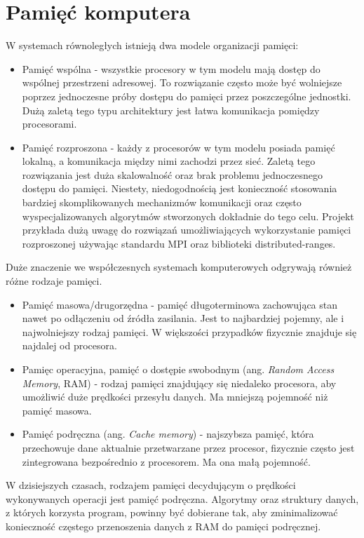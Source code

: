 \documentclass[a4paper,12pt]{book} %
\begin{document}
\section{Pamięć komputera}
W systemach równoległych istnieją dwa modele organizacji pamięci:
\begin{itemize}
	\item Pamięć wspólna - wszystkie procesory w tym modelu mają dostęp do wspólnej przestrzeni adresowej. To rozwiązanie często może być wolniejsze poprzez jednoczesne próby dostępu do pamięci przez poszczególne jednostki. Dużą zaletą tego typu architektury jest łatwa komunikacja pomiędzy procesorami.
	\item Pamięć rozproszona - każdy z procesorów w tym modelu posiada pamięć lokalną, a komunikacja między nimi zachodzi przez sieć. Zaletą tego rozwiązania jest duża skalowalność oraz brak problemu jednoczesnego dostępu do pamięci. Niestety, niedogodnością jest konieczność stosowania bardziej skomplikowanych mechanizmów komunikacji oraz często wyspecjalizowanych algorytmów stworzonych dokładnie do tego celu. Projekt przykłada dużą uwagę do rozwiązań umożliwiających wykorzystanie pamięci rozproszonej używając standardu MPI oraz biblioteki distributed-ranges.
\end{itemize}
Duże znaczenie we współczesnych systemach komputerowych odgrywają również różne rodzaje pamięci.
\begin{itemize}
	\item Pamięć masowa/drugorzędna - pamięć długoterminowa zachowująca stan nawet po odłączeniu od źródła zasilania. Jest to najbardziej pojemny, ale i najwolniejszy rodzaj pamięci. W większości przypadków fizycznie znajduje się najdalej od procesora.
	\item Pamięc operacyjna, pamięć o dostępie swobodnym (ang. \emph{Random Access Memory}, RAM) - rodzaj pamięci znajdujący się niedaleko procesora, aby umożliwić duże prędkości przesyłu danych. Ma mniejszą pojemność niż pamięć masowa.
	\item Pamięć podręczna (ang. \emph{Cache memory}) - najszybsza pamięć, która przechowuje dane aktualnie przetwarzane przez procesor, fizycznie często jest zintegrowana bezpośrednio z procesorem. Ma ona małą pojemność.
\end{itemize}
W dzisiejszych czasach, rodzajem pamięci decydującym o prędkości wykonywanych operacji jest pamięć podręczna. Algorytmy oraz struktury danych, z których korzysta program, powinny być dobierane tak, aby zminimalizować konieczność częstego przenoszenia danych z RAM do pamięci podręcznej.
\end{document}
